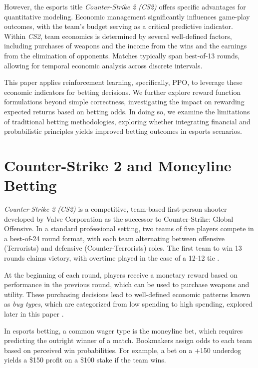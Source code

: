 \documentclass[sigconf]{acmart}
\begin{document}
However, the esports title \textit{Counter-Strike 2 (CS2)} offers specific advantages for quantitative modeling. Economic management significantly influences game-play outcomes, with the team's budget serving as a critical predictive indicator. Within \textit{CS2}, team economics is determined by several well-defined factors, including purchases of weapons and the income from the wins and the earnings from the elimination of opponents. Matches typically span best-of-13 rounds, allowing for temporal economic analysis across discrete intervals.


This paper applies reinforcement learning, specifically, PPO, to leverage these economic indicators for betting decisions. We further explore reward function formulations beyond simple correctness, investigating the impact on rewarding expected returns based on betting odds. In doing so, we examine the limitations of traditional betting methodologies, exploring whether integrating financial and probabilistic principles yields improved betting outcomes in esports scenarios.

\section{Counter-Strike 2 and Moneyline Betting}

\textit{Counter-Strike 2 (CS2)} is a competitive, team-based first-person shooter developed by Valve Corporation as the successor to Counter-Strike: Global Offensive. In a standard professional setting, two teams of five players compete in a best-of-24 round format, with each team alternating between offensive (Terrorists) and defensive (Counter-Terrorists) roles. The first team to win 13 rounds claims victory, with overtime played in the case of a 12-12 tie \cite{cs2competitivewiki}.

At the beginning of each round, players receive a monetary reward based on performance in the previous round, which can be used to purchase weapons and utility. These purchasing decisions lead to well-defined economic patterns known as \textit{buy types}, which are categorized from low spending to high spending, explored later in this paper \cite{cs2moneywiki}.

In esports betting, a common wager type is the moneyline bet, which requires predicting the outright winner of a match. Bookmakers assign odds to each team based on perceived win probabilities. For example, a bet on a +150 underdog yields a \$150 profit on a \$100 stake if the team wins.
\end{document}

